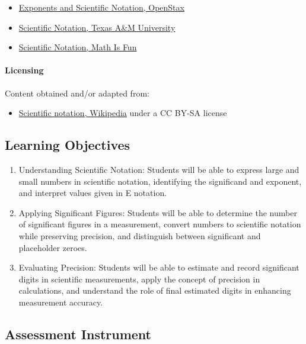 \begin{itemize}
    \item \href{https://openstax.org/books/college-algebra/pages/1-2-exponents-and-scientific-notation}{Exponents and Scientific Notation, OpenStax}
    \item \href{https://www.chem.tamu.edu/class/fyp/mathrev/mr-scnot.html}{Scientific Notation, Texas A\&M University}
    \item \href{https://www.mathsisfun.com/numbers/scientific-notation.html}{Scientific Notation, Math Is Fun}
\end{itemize}

\paragraph{Licensing}

Content obtained and/or adapted from:

\begin{itemize}
    \item \href{https://en.wikipedia.org/wiki/Scientific_notation}{Scientific notation, Wikipedia} under a CC BY-SA license
\end{itemize}

\subsection{Learning Objectives}

\begin{enumerate}
    \item Understanding Scientific Notation: Students will be able to express large and small numbers in scientific notation, identifying the significand and exponent, and interpret values given in E notation.
    \item Applying Significant Figures: Students will be able to determine the number of significant figures in a measurement, convert numbers to scientific notation while preserving precision, and distinguish between significant and placeholder zeroes.
    \item Evaluating Precision: Students will be able to estimate and record significant digits in scientific measurements, apply the concept of precision in calculations, and understand the role of final estimated digits in enhancing measurement accuracy.
\end{enumerate}

\subsection{Assessment Instrument}

